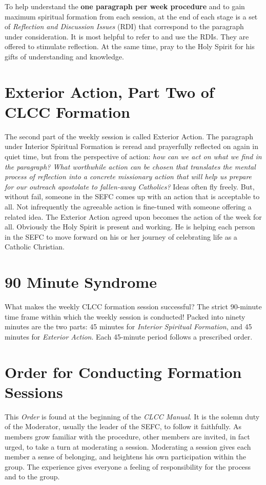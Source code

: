 \documentclass{article}
\begin{document}
To help understand the \textbf{one paragraph per week procedure} and to gain
maximum spiritual formation from each session, at the end of each stage is a set
of \emph{Reflection and Discussion Issues} (RDI) that correspond to the
paragraph under consideration. It is most helpful to refer to and use the
RDIs. They are offered to stimulate reflection. At the same time, pray to the
Holy Spirit for his gifts of understanding and knowledge.

\section{Exterior Action, Part Two of CLCC Formation}

The second part of the weekly session is called Exterior Action. The paragraph
under Interior Spiritual Formation is reread and prayerfully reflected on again
in quiet time, but from the perspective of action: \emph{how can we act on what
we find in the paragraph? What worthwhile action can be chosen that translates
the mental process of reflection into a concrete missionary action that will
help us prepare for our outreach apostolate to fallen-away Catholics?} Ideas
often fly freely. But, without fail, someone in the SEFC comes up with an action
that is acceptable to all. Not infrequently the agreeable action is fine-tuned
with someone offering a related idea. The Exterior Action agreed upon becomes
the action of the week for all. Obviously the Holy Spirit is present and
working. He is helping each person in the SEFC to move forward on his or her
journey of celebrating life as a Catholic Christian.

\section{90 Minute Syndrome}

What makes the weekly CLCC formation session successful? The strict 90-minute
time frame within which the weekly session is conducted! Packed into ninety
minutes are the two parts: 45 minutes for \emph{Interior Spiritual Formation},
and 45 minutes for \emph{Exterior Action}. Each 45-minute period follows a
prescribed order.

\section{Order for Conducting Formation Sessions}

This \emph{Order} is found at the beginning of the \emph{CLCC Manual}. It is the
solemn duty of the Moderator, usually the leader of the SEFC, to follow it
faithfully. As members grow familiar with the procedure, other members are
invited, in fact urged, to take a turn at moderating a session. Moderating a
session gives each member a sense of belonging, and heightens his own
participation within the group. The experience gives everyone a feeling of
responsibility for the process and to the group.
\end{document}
